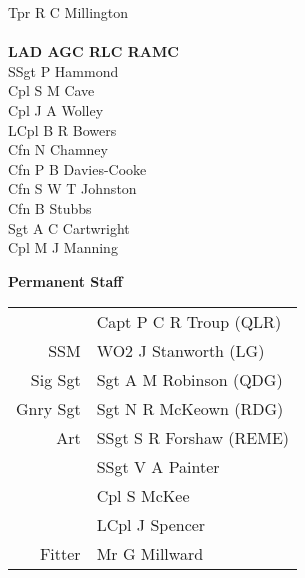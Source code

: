 \begin{multicols}{3}
  Tpr R C Millington \\
  \\
  \textbf{LAD AGC RLC RAMC} \\
  SSgt P Hammond \\
  Cpl S M Cave \\
  Cpl J A Wolley \\
  LCpl B R Bowers \\
  Cfn N Chamney \\
  Cfn P B Davies-Cooke \\
  Cfn S W T Johnston \\
  Cfn B Stubbs \\
  Sgt A C Cartwright \\
  Cpl M J Manning \\
\end{multicols}

\pagebreak

\vspace*{20mm}

\begin{center}
  \Large
  \textbf{Permanent Staff}
\end{center}

\begin{center}
  \small
  \begin{tabular}{rl}
    & Capt P C R Troup (QLR) \\
    SSM & WO2 J Stanworth (LG) \\
    Sig Sgt & Sgt A M Robinson (QDG) \\
    Gnry Sgt & Sgt N R McKeown (RDG) \\
    Art & SSgt S R Forshaw (REME) \\
    & SSgt V A Painter \\
    & Cpl S McKee \\
    & LCpl J Spencer \\
    Fitter & Mr G Millward \\
  \end{tabular}
\end{center}
